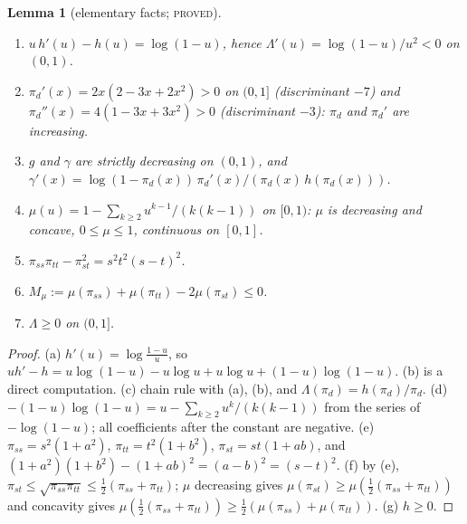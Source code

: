 \documentclass[11pt]{article}
\theoremstyle{plain}
\newtheorem{lemma}[theorem]{Lemma}
\theoremstyle{definition}
\theoremstyle{remark}
\newcommand{\Lam}{\Lambda}
\newcommand{\lbl}[1]{\textsc{#1}}
\begin{document}
\begin{lemma}[elementary facts; \lbl{proved}]\label{lem:phi-L0}
\leavevmode
\begin{enumerate}[label=(\alph*),nosep]
\item $u\,h'(u)-h(u)=\log(1-u)$, hence $\Lam'(u)=\log(1-u)/u^2<0$ on $(0,1)$.
\item $\pi_d'(x)=2x(2-3x+2x^2)>0$ on $(0,1]$ (discriminant $-7$) and
$\pi_d''(x)=4(1-3x+3x^2)>0$ (discriminant $-3$): $\pi_d$ and $\pi_d'$ are increasing.
\item $g$ and $\gamma$ are strictly decreasing on $(0,1)$, and
$\gamma'(x)=\log(1-\pi_d(x))\,\pi_d'(x)/(\pi_d(x)\,h(\pi_d(x)))$.
\item $\mu(u)=1-\sum_{k\ge2}u^{k-1}/(k(k-1))$ on $[0,1)$: $\mu$ is
decreasing and concave, $0\le\mu\le1$, continuous on $[0,1]$.
\item $\pi_{ss}\pi_{tt}-\pi_{st}^2=s^2t^2(s-t)^2$.
\item $M_\mu:=\mu(\pi_{ss})+\mu(\pi_{tt})-2\mu(\pi_{st})\le0$.
\item $\Lam\ge0$ on $(0,1]$.
\end{enumerate}
\end{lemma}
\begin{proof}
(a) $h'(u)=\log\frac{1-u}u$, so $uh'-h=u\log(1-u)-u\log u+u\log u+(1-u)\log(1-u)$.
(b) is a direct computation.  (c) chain rule with (a), (b), and
$\Lam(\pi_d)=h(\pi_d)/\pi_d$.  (d) $-(1-u)\log(1-u)=u-\sum_{k\ge2}u^k/(k(k-1))$
from the series of $-\log(1-u)$; all coefficients after the constant are
negative.  (e) $\pi_{ss}=s^2(1+a^2)$, $\pi_{tt}=t^2(1+b^2)$,
$\pi_{st}=st(1+ab)$, and $(1+a^2)(1+b^2)-(1+ab)^2=(a-b)^2=(s-t)^2$.
(f) by (e), $\pi_{st}\le\sqrt{\pi_{ss}\pi_{tt}}\le\tfrac12(\pi_{ss}+\pi_{tt})$;
$\mu$ decreasing gives $\mu(\pi_{st})\ge\mu(\tfrac12(\pi_{ss}+\pi_{tt}))$ and
concavity gives $\mu(\tfrac12(\pi_{ss}+\pi_{tt}))\ge\tfrac12(\mu(\pi_{ss})+\mu(\pi_{tt}))$.
(g) $h\ge0$.
\end{proof}
\end{document}
